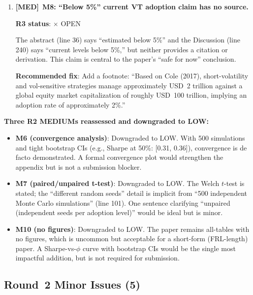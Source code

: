 \documentclass[12pt,a4paper]{article}
\newcommand{\MED}{\textbf{\textcolor{warncolor}{[MED]}}}
\newcommand{\OPEN}{\textcolor{errorred}{$\times$ OPEN}}
\begin{document}
\begin{enumerate}
\medskip

\item \MED\ \textbf{M8: ``Below 5\%'' current VT adoption claim has no source.}

\textbf{R3 status}: \OPEN

The abstract (line 36) says ``estimated below 5\%'' and the Discussion (line 240) says ``current levels below 5\%,'' but neither provides a citation or derivation. This claim is central to the paper's ``safe for now'' conclusion.

\textbf{Recommended fix}: Add a footnote: ``Based on Cole (2017), short-volatility and vol-sensitive strategies manage approximately USD~2 trillion against a global equity market capitalization of roughly USD~100 trillion, implying an adoption rate of approximately 2\%.''

\end{enumerate}

\medskip

\noindent\textbf{Three R2 MEDIUMs reassessed and downgraded to LOW:}

\begin{itemize}
  \item \textbf{M6 (convergence analysis)}: Downgraded to LOW. With 500 simulations and tight bootstrap CIs (e.g., Sharpe at 50\%: [0.31, 0.36]), convergence is de facto demonstrated. A formal convergence plot would strengthen the appendix but is not a submission blocker.
  \item \textbf{M7 (paired/unpaired t-test)}: Downgraded to LOW. The Welch $t$-test is stated; the ``different random seeds'' detail is implicit from ``500 independent Monte Carlo simulations'' (line 101). One sentence clarifying ``unpaired (independent seeds per adoption level)'' would be ideal but is minor.
  \item \textbf{M10 (no figures)}: Downgraded to LOW. The paper remains all-tables with no figures, which is uncommon but acceptable for a short-form (FRL-length) paper. A Sharpe-vs-$\phi$ curve with bootstrap CIs would be the single most impactful addition, but is not required for submission.
\end{itemize}


\subsection*{Round~2 Minor Issues (5)}
\end{document}
